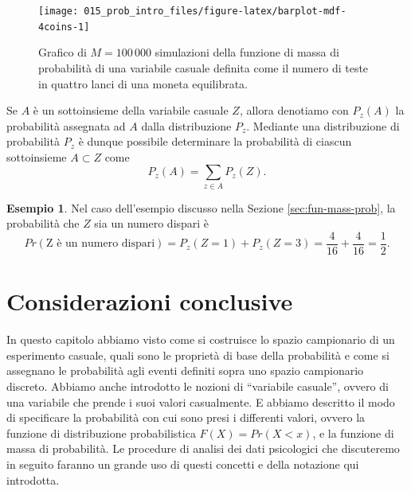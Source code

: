 \documentclass[
  10pt,
  italian,
  a4paper,
  extrafontsizes,onecolumn,openright
  ]{memoir}
\theoremstyle{definition}
\theoremstyle{definition}
\newtheorem{example}{Esempio}[chapter]
\theoremstyle{definition}
\theoremstyle{definition}
\theoremstyle{remark}
\begin{document}
\begin{figure}[h]

{\centering \texttt{[image: 015\_prob\_intro\_files/figure-latex/barplot-mdf-4coins-1]} 

}

\caption{Grafico di $M = 100\,000$ simulazioni della funzione di massa di probabilità di una variabile casuale definita come il numero di teste in quattro lanci di una moneta equilibrata.}\label{fig:barplot-mdf-4coins}
\end{figure}

Se \(A\) è un sottoinsieme della variabile casuale \(Z\), allora denotiamo
con \(P_{z}(A)\) la probabilità assegnata ad \(A\) dalla distribuzione
\(P_{z}\). Mediante una distribuzione di probabilità \(P_{z}\) è dunque
possibile determinare la probabilità di ciascun sottoinsieme
\(A \subset Z\) come
\[
P_{z}(A) = \sum_{z \in A} P_{z}(Z).
\]

\begin{example}
Nel caso dell'esempio discusso nella Sezione \ref{sec:fun-mass-prob}, la probabilità che \(Z\) sia un numero dispari è
\[
Pr(\text{Z è un numero dispari}) = P_{z}(Z = 1) + P_{z}(Z = 3) = \frac{4}{16} + \frac{4}{16} = \frac{1}{2}.
\]
\end{example}

\hypertarget{considerazioni-conclusive}{%
\section*{Considerazioni conclusive}\label{considerazioni-conclusive}}

In questo capitolo abbiamo visto come si costruisce lo spazio
campionario di un esperimento casuale, quali sono le proprietà di base
della probabilità e come si assegnano le probabilità agli eventi
definiti sopra uno spazio campionario discreto. Abbiamo anche introdotto
le nozioni di ``variabile casuale'', ovvero di una variabile che prende i suoi valori casualmente. E abbiamo descritto il modo di specificare la probabilità con cui sono presi i differenti valori, ovvero la funzione di distribuzione probabilistica \(F(X) = Pr(X < x)\), e la funzione di massa di probabilità. Le procedure di analisi dei dati psicologici che discuteremo in seguito faranno un grande uso di questi concetti e della notazione qui introdotta.


\end{document}
